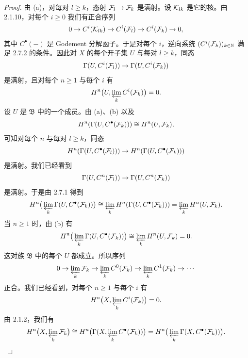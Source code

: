 \begin{proof}
由 (a)，对每对 $l\ge k$，态射 $\mathcal{F}_l\to\mathcal{F}_k$ 是满射。设 $\mathcal{K}_{lk}$ 是它的核。由 2.1.10，对每个 $i\ge0$ 我们有正合序列
\begin{equation*}
0\to C^i(\mathcal{K}_{lk})\to C^i(\mathcal{F}_l)\to C^i(\mathcal{F}_k)\to 0,
\end{equation*}
其中 $C^{\bullet}(-)$ 是 Godement 分解函子。于是对每个 $i$，逆向系统 $(C^i(\mathcal{F}_k))_{k\in\mathbb{N}}$ 满足 2.7.2 的条件。因此对 $X$ 的每个开子集 $U$ 与每对 $l\ge k$，同态
\begin{equation*}
\Gamma(U,C^i(\mathcal{F}_l))\to\Gamma(U,C^i(\mathcal{F}_k))
\end{equation*}
是满射，且对每个 $n\ge1$ 与每个 $i$ 有
\begin{equation*}
H^n\big(U,\varprojlim_k C^i(\mathcal{F}_k)\big)=0.
\end{equation*}
设 $U$ 是 $\mathfrak{B}$ 中的一个成员。由 (a)、(b) 以及
\begin{equation*}
H^n(\Gamma(U,C^{\bullet}(\mathcal{F}_k)))\cong H^n(U,\mathcal{F}_k),
\end{equation*}
可知对每个 $n$ 与每对 $l\ge k$，同态
\begin{equation*}
H^n(\Gamma(U,C^{\bullet}(\mathcal{F}_l)))\to H^n(\Gamma(U,C^{\bullet}(\mathcal{F}_k)))
\end{equation*}
是满射。我们已经看到
\begin{equation*}
\Gamma(U,C^n(\mathcal{F}_l))\to\Gamma(U,C^n(\mathcal{F}_k))
\end{equation*}
是满射。于是由 2.7.1 得到
\begin{equation*}
H^n\big(\varprojlim_k\Gamma(U,C^{\bullet}(\mathcal{F}_k))\big)\cong\varprojlim_k H^n(\Gamma(U,C^{\bullet}(\mathcal{F}_k)))=\varprojlim_k H^n(U,\mathcal{F}_k).
\end{equation*}
当 $n\ge1$ 时，由 (b) 有
\begin{equation*}
H^n\big(\varprojlim_k\Gamma(U,C^{\bullet}(\mathcal{F}_k))\big)\cong\varprojlim_k H^n(U,\mathcal{F}_k)=0.
\end{equation*}
这对族 $\mathfrak{B}$ 中的每个 $U$ 都成立。所以序列
\begin{equation*}
0\to\varprojlim_k\mathcal{F}_k\to\varprojlim_k C^0(\mathcal{F}_k)\to\varprojlim_k C^1(\mathcal{F}_k)\to\cdots
\end{equation*}
正合。我们已经看到，对每个 $n\ge1$ 与每个 $i$ 有
\begin{equation*}
H^n\big(X,\varprojlim_k C^i(\mathcal{F}_k)\big)=0.
\end{equation*}
由 2.1.2，我们有
\begin{equation*}
H^n\big(X,\varprojlim_k\mathcal{F}_k\big)\cong H^n\big(\Gamma(X,\varprojlim_k C^{\bullet}(\mathcal{F}_k))\big)=H^n\big(\varprojlim_k\Gamma(X,C^{\bullet}(\mathcal{F}_k))\big).
\end{equation*}

\end{proof}
